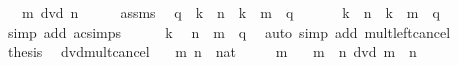\begin{isabellebody}
\ \ \ {\isachardoublequoteopen}m\ dvd\ n{\isachardoublequoteclose}\isanewline
%
\isadelimproof
%
\endisadelimproof
%
\isatagproof
{}\isamarkupfalse%
\ {\isacharminus}{\kern0pt}\isanewline
\ \ \isamarkupfalse%
\ assms{\isacharparenleft}{\kern0pt}{}{\isacharparenright}{\kern0pt}\ \isamarkupfalse%
\ q\ \ {\isachardoublequoteopen}k\ {\isacharasterisk}{\kern0pt}\ n\ {\isacharequal}{\kern0pt}\ {\isacharparenleft}{\kern0pt}k\ {\isacharasterisk}{\kern0pt}\ m{\isacharparenright}{\kern0pt}\ {\isacharasterisk}{\kern0pt}\ q{\isachardoublequoteclose}\ \isacommand{{\isachardot}{\kern0pt}{\isachardot}{\kern0pt}}\isamarkupfalse%
\isanewline
\ \ \isamarkupfalse%
\ \isamarkupfalse%
\ {\isachardoublequoteopen}k\ {\isacharasterisk}{\kern0pt}\ n\ {\isacharequal}{\kern0pt}\ k\ {\isacharasterisk}{\kern0pt}\ {\isacharparenleft}{\kern0pt}m\ {\isacharasterisk}{\kern0pt}\ q{\isacharparenright}{\kern0pt}{\isachardoublequoteclose}\ \isamarkupfalse%
\ {\isacharparenleft}{\kern0pt}simp\ add{\isacharcolon}{\kern0pt}\ ac{\isacharunderscore}{\kern0pt}simps{\isacharparenright}{\kern0pt}\isanewline
\ \ \isamarkupfalse%
\ {\isacartoucheopen}{}\ {\isacharless}{\kern0pt}\ k{\isacartoucheclose}\ \isamarkupfalse%
\ {\isachardoublequoteopen}n\ {\isacharequal}{\kern0pt}\ m\ {\isacharasterisk}{\kern0pt}\ q{\isachardoublequoteclose}\ \isamarkupfalse%
\ {\isacharparenleft}{\kern0pt}auto\ simp\ add{\isacharcolon}{\kern0pt}\ mult{\isacharunderscore}{\kern0pt}left{\isacharunderscore}{\kern0pt}cancel{\isacharparenright}{\kern0pt}\isanewline
\ \ \isamarkupfalse%
\ \isamarkupfalse%
\ {\isacharquery}{\kern0pt}thesis\ \isacommand{{\isachardot}{\kern0pt}{\isachardot}{\kern0pt}}\isamarkupfalse%
\isanewline
{}\isamarkupfalse%
%
\endisatagproof
{\isafoldproof}%
%
\isadelimproof
\isanewline
%
\endisadelimproof
\isanewline
{}\isamarkupfalse%
\ dvd{\isacharunderscore}{\kern0pt}mult{\isacharunderscore}{\kern0pt}cancel{}{\isacharcolon}{\kern0pt}\isanewline
\ \ \ m\ n\ {\isacharcolon}{\kern0pt}{\isacharcolon}{\kern0pt}\ nat\isanewline
\ \ \ {\isachardoublequoteopen}{}\ {\isacharless}{\kern0pt}\ m{\isachardoublequoteclose}\isanewline
\ \ \ {\isachardoublequoteopen}m\ {\isacharasterisk}{\kern0pt}\ n\ dvd\ m\ {\isasymlongleftrightarrow}\ n\ {\isacharequal}{\kern0pt}\ {}{\isachardoublequoteclose}\isanewline

\end{isabellebody}
